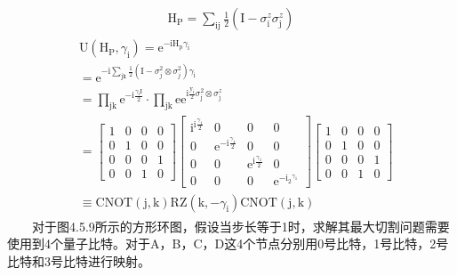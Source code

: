 \documentclass[a4paper,11pt,english]{sphinxmanual}
\begin{document}
\begin{equation*}
\begin{split}\mathrm{H}_{\mathrm{P}}=\sum_{\mathrm{ij}} \frac{1}{2}\left(\mathrm{I}-\sigma_{\mathrm{i}}^{z} \sigma_{\mathrm{j}}^{z}\right)\end{split}
\end{equation*}\begin{equation*}
\begin{split}\begin{aligned} &\mathrm{U}\left(\mathrm{H}_{\mathrm{P}}, \gamma_{\mathrm{i}}\right)=\mathrm{e}^{-\mathrm{iH}_{\mathrm{p}} \gamma_{\mathrm{i}}}\\ &=\mathrm{e}^{-\mathrm{i} \sum_{\mathrm{jk}} \frac{1}{2}\left(\mathrm{I}-\sigma_{j}^{2} \otimes \sigma_{j}^{2}\right) \gamma_{\mathrm{i}}}\\ &=\prod_{\mathrm{jk}} \mathrm{e}^{-\mathrm{i} \frac{\gamma_{\mathrm{i}} \mathrm{I}}{2}} \cdot \prod_{\mathrm{jk}} \mathrm{e} \mathrm{e}^{\mathrm{i} \frac{\mathrm{y}_{\mathrm{i}}}{2} \sigma_{\mathrm{j}}^{2} \otimes \sigma_{\mathrm{j}}^{z}}\\ &=\left[\begin{array}{cccc} 1 & 0 & 0 & 0 \\ 0 & 1 & 0 & 0 \\ 0 & 0 & 0 & 1 \\ 0 & 0 & 1 & 0 \end{array}\right]\left[\begin{array}{cccc} \mathrm{i}^{\mathrm{i} \frac{\gamma_{1}}{2}} & 0 & 0 & 0 \\ 0 & \mathrm{e}^{-\mathrm{i} \frac{\gamma_{1}}{2}} & 0 & 0 \\ 0 & 0 & \mathrm{e}^{\mathrm{i} \frac{\gamma_{1}}{2}} & 0 \\ 0 & 0 & 0 & \mathrm{e}^{-\mathrm{i}_{2}{ }^{\gamma_{1}}} \end{array}\right]\left[\begin{array}{llll} 1 & 0 & 0 & 0 \\ 0 & 1 & 0 & 0 \\ 0 & 0 & 0 & 1 \\ 0 & 0 & 1 & 0 \end{array}\right]\\ &\equiv \mathrm{CNOT}(\mathrm{j}, \mathrm{k}) \mathrm{RZ}\left(\mathrm{k},-\gamma_{\mathrm{i}}\right) \mathrm{CNOT}(\mathrm{j}, \mathrm{k}) \end{aligned}\end{split}
\end{equation*}
\sphinxAtStartPar
  对于图4.5.9所示的方形环图，假设当步长等于1时，求解其最大切割问题需要使用到4个量子比特。对于A，B，C，D这4个节点分别用0号比特，1号比特，2号比特和3号比特进行映射。
\end{document}
